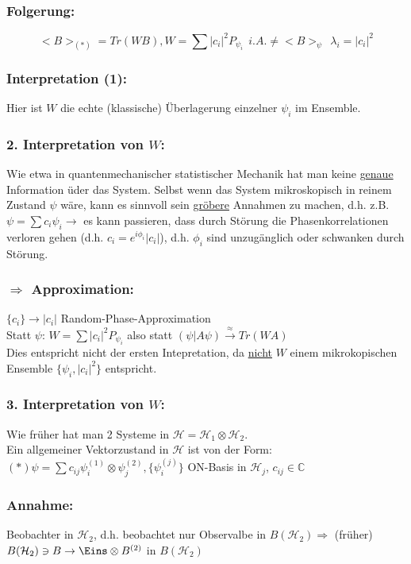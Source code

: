 \documentclass[twoside,a4paper]{scrartcl}
\newcommand{\C}{\mathbb{C}}
\renewcommand{\1}{\mathds{1}}
\newcommand{\Ra}{\Rightarrow}
\newcommand{\ra}{\rightarrow}
\renewcommand{\l}{\lambda}
\renewcommand{\H}{\mathcal{H}}
\renewcommand{\C}{\mathbb{C}}
\begin{document}
\subsubsection*{Folgerung:}
$$<B>_{(*)}=Tr(WB), W=\sum |c_i|^2 P_{\psi_i} \ \  i.A. \neq <B>_\psi  \ \ \l_i=|c_i|^2$$
\subsubsection*{Interpretation (1):}
Hier ist $W$ die echte (klassische) Überlagerung einzelner $\psi_i$ im Ensemble.
\subsubsection*{2. Interpretation von $W$:}
Wie etwa in quantenmechanischer statistischer Mechanik hat man keine \underline{genaue} Information üder das System. Selbst wenn das System mikroskopisch in reinem Zustand $\psi$ wäre, kann es sinnvoll sein \underline{gröbere} Annahmen zu machen, d.h. z.B. $\psi=\sum c_i \psi_i \ra$ es kann passieren, dass durch Störung die Phasenkorrelationen verloren gehen (d.h. $c_i=e^{i\phi_i}|c_i|$), d.h. $\phi_i$ sind unzugänglich oder schwanken durch Störung.
\subsubsection*{$\Ra$ Approximation:}
$\{c_i \} \ra |c_i|$ Random-Phase-Approximation\\
Statt $\psi$: $W=\sum |c_i|^2 P_{\psi_i}$ also statt $(\psi|A\psi) \stackrel{\approx}{\ra} Tr(WA)$\\
Dies entspricht nicht der ersten Intepretation, da \underline{nicht} $W$ einem mikrokopischen Ensemble $\{\psi_i, |c_i|^2\}$ entspricht.\\
\subsubsection*{3. Interpretation von $W$:}
Wie früher hat man 2 Systeme in $\H=\H_1\otimes \H_2$.\\
Ein allgemeiner Vektorzustand in $\H$ ist von der Form: $(*) \psi=\sum c_{ij} \psi_i^{(1)} \otimes \psi_j^{(2)}, \{\psi_i^{(j)}\}$ ON-Basis in $\H_j$, $c_{ij} \in \C$
\subsubsection*{Annahme:}
Beobachter in $\H_2$, d.h. beobachtet nur Observalbe in $B(\H_2) \Ra$ (früher) $B(\H_2) \ni B \ra \Eins \otimes B^{(2)}$ in $B(\H_2)$
\end{document}
